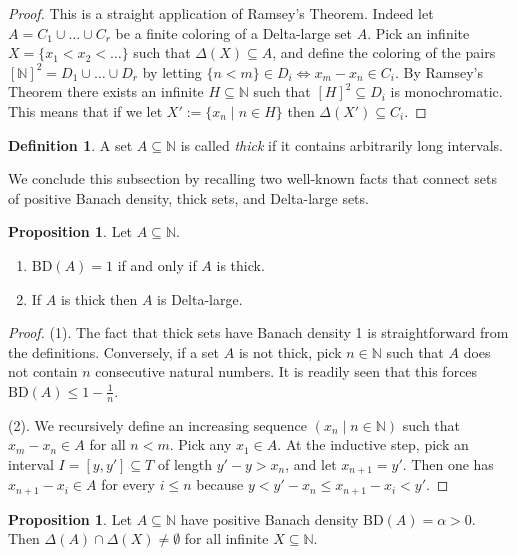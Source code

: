 \documentclass[a4paper,oneside]{article}
\newcommand{\N}{\mathbb{N}}
\theoremstyle{definition}
\newtheorem{proposition}[theorem]{Proposition}
\newtheorem{definition}[theorem]{Definition}
\theoremstyle{named}
\begin{document}
\begin{proof}
This is a straight application of Ramsey's Theorem.
Indeed let $A=C_1\cup\ldots\cup C_r$ be a finite coloring of
a Delta-large set $A$. Pick an infinite $X=\{x_1<x_2<\ldots\}$
such that $\Delta(X)\subseteq A$, and define the coloring
of the pairs $[\N]^2=D_1\cup\ldots\cup D_r$ by letting $\{n<m\}\in D_i\Leftrightarrow x_m-x_n\in C_i$.
By Ramsey's Theorem there exists an infinite $H\subseteq\N$ such that $[H]^2\subseteq D_i$ is monochromatic.
This means that if we let $X':=\{x_n\mid n\in H\}$ then $\Delta(X')\subseteq C_i$.
\end{proof}

\begin{definition}
{\rm A set $A\subseteq\N$ is called \emph{thick} 
if it contains arbitrarily long intervals.}
\end{definition}

We conclude this subsection by recalling two well-known facts that 
connect sets of positive Banach density, thick sets, and Delta-large sets.

\begin{proposition}\label{thick}
Let $A\subseteq\N$. 
\begin{enumerate}
\item
$\text{BD}(A)=1$ if and only if $A$ is thick.
\item
If $A$ is thick then $A$ is Delta-large.
\end{enumerate}
\end{proposition}

\begin{proof} (1). The fact that thick sets have Banach density 1 is straightforward from the definitions.
Conversely, if a set $A$ is not thick, 
pick $n\in\N$ such that $A$ does not contain $n$ consecutive natural numbers.
It is readily seen that this forces $\text{BD}(A)\leq 1-\frac{1}{n}$.

(2). We recursively define an increasing sequence $(x_n\mid n\in\N)$
such that $x_m-x_n\in A$ for all $n<m$.
Pick any $x_1\in A$. At the inductive step,
pick an interval $I=[y, y']\subseteq T$ of length $y'-y>x_n$, and let $x_{n+1}=y'$.
Then one has $x_{n+1}-x_i\in A$ for every $i\le n$ because
$y<y'-x_n\le x_{n+1}-x_i<y'$.\end{proof}

\begin{proposition}\label{Delta-set-intersection}
Let $A\subseteq\N$ have positive Banach density $\text{BD}(A)=\alpha>0$. Then $\Delta(A)\cap\Delta(X)\ne\emptyset$
for all infinite $X\subseteq\N$.
\end{proposition}
\end{document}
